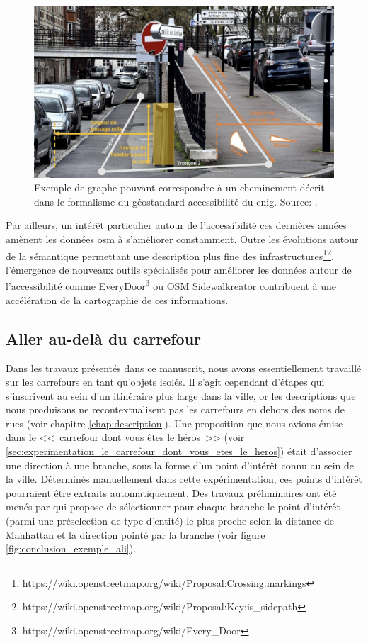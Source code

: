 \begin{figure}[ht]
    \centering
    \includegraphics[width=\textwidth]{images/conclusion/graphe_geostandard.png}
    \caption[Graphe de cheminement du géostandard]{Exemple de graphe pouvant correspondre à un cheminement décrit dans le formalisme du géostandard accessibilité du \gls{cnig}. Source: \citep{geostandard2021}.}
    \label{fig:conclusion_exemple_lom}
\end{figure}

\newpar{}

Par ailleurs, un intérêt particulier autour de l'accessibilité ces dernières années amènent les données \gls{osm} à s'améliorer constamment. Outre les évolutions autour de la sémantique permettant une description plus fine des infrastructures\footnote{https://wiki.openstreetmap.org/wiki/Proposal:Crossing:markings}\footnote{https://wiki.openstreetmap.org/wiki/Proposal:Key:is\_sidepath}, l'émergence de nouveaux outils spécialisés pour améliorer les données autour de l'accessibilité comme EveryDoor\footnote{https://wiki.openstreetmap.org/wiki/Every\_Door} ou OSM Sidewalkreator \citep{demoraesvestena2023} contribuent à une accélération de la cartographie de ces informations.

\subsection{Aller au-delà du carrefour}

Dans les travaux présentés dans ce manuscrit, nous avons essentiellement travaillé sur les carrefours en tant qu'objets isolés. Il s'agit cependant d'étapes qui s'inscrivent au sein d'un itinéraire \citep{gaunet_verbal_2006} plus large dans la ville, or les descriptions que nous produisons ne recontextualisent pas les carrefours en dehors des noms de rues (voir chapitre \ref{chap:description}). Une proposition que nous avions émise dans le <<~carrefour dont vous êtes le héros~>> (voir \ref{sec:experimentation_le_carrefour_dont_vous_etes_le_heros}) était d'associer une direction à une branche, sous la forme d'un point d'intérêt connu au sein de la ville. Déterminés manuellement dans cette expérimentation, ces points d'intérêt pourraient être extraits automatiquement. Des travaux préliminaires ont été menés par \citet{aouini2023} qui propose de sélectionner pour chaque branche le point d'intérêt (parmi une préselection de type d'entité) le plus proche selon la distance de Manhattan et la direction pointé par la branche (voir figure \ref{fig:conclusion_exemple_ali}).

